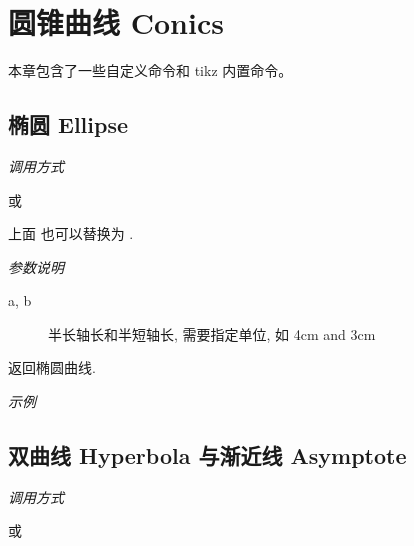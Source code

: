 \chapter{圆锥曲线 Conics}

本章包含了一些自定义命令和 tikz 内置命令。

\section{椭圆 Ellipse}

\emph{调用方式}

\begin{tcolorbox}{}
\end{tcolorbox}

或

\begin{tcolorbox}{}
\end{tcolorbox}

\begin{remark*}
上面  也可以替换为 .
\end{remark*}

\emph{参数说明}

\begin{description}
  \item[a, b] 半长轴长和半短轴长, 需要指定单位, 如 4cm and 3cm
\end{description}

返回椭圆曲线.

\emph{示例}



\section{双曲线 Hyperbola 与渐近线 Asymptote}

\emph{调用方式}

\begin{tcolorbox}{}
\end{tcolorbox}

或

\begin{tcolorbox}{}
\end{tcolorbox}

